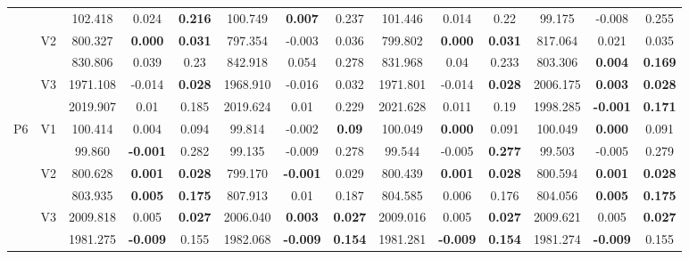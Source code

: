 \documentclass[12pt,a4paper]{article}
\begin{document}
\begin{sidewaystable}[ht]
{\begin{tabular}{cc|ccc|ccc|ccc|ccc|}
   &  & 102.418 & 0.024 & \textbf{0.216} & 100.749 & \textbf{0.007} & 0.237 & 101.446 & 0.014 & 0.22 & 99.175 & -0.008 & 0.255 \\ 
   & \multirow{2}{*}{V2} & 800.327 & \textbf{0.000} & \textbf{0.031} & 797.354 & -0.003 & 0.036 & 799.802 & \textbf{0.000} & \textbf{0.031} & 817.064 & 0.021 & 0.035 \\ 
   &  & 830.806 & 0.039 & 0.23 & 842.918 & 0.054 & 0.278 & 831.968 & 0.04 & 0.233 & 803.306 & \textbf{0.004} & \textbf{0.169} \\ 
   & \multirow{2}{*}{V3} & 1971.108 & -0.014 & \textbf{0.028} & 1968.910 & -0.016 & 0.032 & 1971.801 & -0.014 & \textbf{0.028} & 2006.175 & \textbf{0.003} & \textbf{0.028} \\ 
   &  & 2019.907 & 0.01 & 0.185 & 2019.624 & 0.01 & 0.229 & 2021.628 & 0.011 & 0.19 & 1998.285 & \textbf{-0.001} & \textbf{0.171} \\ 
   \hline \hline\multirow{6}{*}{P6} & \multirow{2}{*}{V1} & 100.414 & 0.004 & 0.094 & 99.814 & -0.002 & \textbf{0.09} & 100.049 & \textbf{0.000} & 0.091 & 100.049 & \textbf{0.000} & 0.091 \\ 
   &  & 99.860 & \textbf{-0.001} & 0.282 & 99.135 & -0.009 & 0.278 & 99.544 & -0.005 & \textbf{0.277} & 99.503 & -0.005 & 0.279 \\ 
   & \multirow{2}{*}{V2} & 800.628 & \textbf{0.001} & \textbf{0.028} & 799.170 & \textbf{-0.001} & 0.029 & 800.439 & \textbf{0.001} & \textbf{0.028} & 800.594 & \textbf{0.001} & \textbf{0.028} \\ 
   &  & 803.935 & \textbf{0.005} & \textbf{0.175} & 807.913 & 0.01 & 0.187 & 804.585 & 0.006 & 0.176 & 804.056 & \textbf{0.005} & \textbf{0.175} \\ 
   & \multirow{2}{*}{V3} & 2009.818 & 0.005 & \textbf{0.027} & 2006.040 & \textbf{0.003} & \textbf{0.027} & 2009.016 & 0.005 & \textbf{0.027} & 2009.621 & 0.005 & \textbf{0.027} \\ 
   &  & 1981.275 & \textbf{-0.009} & 0.155 & 1982.068 & \textbf{-0.009} & \textbf{0.154} & 1981.281 & \textbf{-0.009} & \textbf{0.154} & 1981.274 & \textbf{-0.009} & 0.155 \\ 
   \hline
\end{tabular}
}
\end{sidewaystable}
\end{document}
